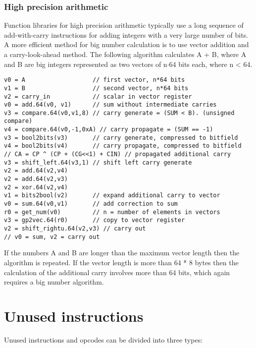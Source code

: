 \documentclass[forwardcom.tex]{subfiles}
\begin{document}
\subsubsection{High precision arithmetic} \label{highPrecisionArithmetic}
Function libraries for high precision arithmetic typically use a long sequence of add-with-carry instructions for adding integers with a very large number of bits. A more efficient method for big number calculation is to use vector addition and a carry-look-ahead method. The following algorithm calculates A + B, where A and B are big integers represented as two vectors of n$\cdot$64 bits each, where n \textless{} 64.
\vspace{2mm}

\begin{lstlisting}[frame=none]
v0 = A                   // first vector, n*64 bits
v1 = B                   // second vector, n*64 bits
v2 = carry_in            // scalar in vector register
v0 = add.64(v0, v1)      // sum without intermediate carries
v3 = compare.64(v0,v1,8) // carry generate = (SUM < B). (unsigned compare)
v4 = compare.64(v0,-1,0xA) // carry propagate = (SUM == -1) 
v3 = bool2bits(v3)       // carry generate, compressed to bitfield
v4 = bool2bits(v4)       // carry propagate, compressed to bitfield
// CA = CP ^ (CP + (CG<<1) + CIN) // propagated additional carry
v3 = shift_left.64(v3,1) // shift left carry generate
v2 = add.64(v2,v4)
v2 = add.64(v2,v3)
v2 = xor.64(v2,v4)
v1 = bits2bool(v2)       // expand additional carry to vector
v0 = sum.64(v0,v1)       // add correction to sum
r0 = get_num(v0)         // n = number of elements in vectors
v3 = gp2vec.64(r0)       // copy to vector register
v2 = shift_rightu.64(v2,v3) // carry out
// v0 = sum, v2 = carry out
\end{lstlisting}
\vspace{2mm}

If the numbers A and B are longer than the maximum vector length then the algorithm is repeated. If the vector length is more than 64 * 8 bytes then the calculation of the additional carry involves more than 64 bits, which again requires a big number algorithm.


\section{Unused instructions} \label{unusedInstructions}
Unused instructions and opcodes can be divided into three types:
\end{document}
